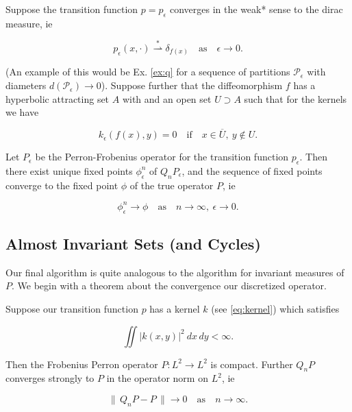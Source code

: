 \begin{proposition}
    \cite*{attr, measure, algGAIO, perturbationsbook, perturbationsart} 
    Suppose the transition function $p = p_\epsilon$ converges in the weak* sense to the 
    dirac measure, ie 

    \begin{equation}
        p_\epsilon (x, \cdot) \overset{*}{\rightharpoonup} \delta_{f(x)} 
        \quad\text{as}\quad \epsilon \to 0.
    \end{equation}

    (An example of this would be Ex. \ref{ex:q} for a sequence of partitions 
    $\mathcal{P}_\epsilon$ with diameters $d(\mathcal{P}_\epsilon) \to 0$).
    Suppose further that the diffeomorphism $f$ has a hyperbolic attracting set $A$ with
    and an open set $U \supset A$ such that for the kernels we have

    \begin{equation}
        k_\epsilon (f(x), y) = 0 \quad\text{if}\quad x \in \overline{U},\ y \notin U.
    \end{equation}

    Let $P_\epsilon$ be the Perron-Frobenius operator for the transition function 
    $p_\epsilon$. Then there exist unique fixed points $\phi_\epsilon^n$ of $Q_n P_\epsilon$, 
    and the sequence of fixed points converge to the fixed point $\phi$ of the true 
    operator $P$, ie

    \begin{equation}
        \phi_\epsilon^n \to \phi 
        \quad\text{as}\quad n \to \infty,\ \epsilon \to 0.
    \end{equation}
\end{proposition}


\subsection{Almost Invariant Sets (and Cycles)}

Our final algorithm is quite analogous to the algorithm for invariant measures of $P$. We 
begin with a theorem about the convergence our discretized operator.

\begin{theorem}
    \label{thm:QnP}
    \cite*{attr}
    Suppose our transition function $p$ has a kernel $k$ (see \autoref{eq:kernel}) which 
    satisfies 

    \begin{equation}
        \iint |k(x, y)|^2\ dx\,dy < \infty. 
    \end{equation}

    Then the Frobenius Perron operator $P : L^2 \to L^2$ is compact. Further $Q_n P$ 
    converges strongly to $P$ in the operator norm on $L^2$, ie

    \begin{equation}
        \|\, Q_n P - P \,\| \to 0 \quad \text{as} \quad n \to \infty .
    \end{equation}

\end{theorem}

